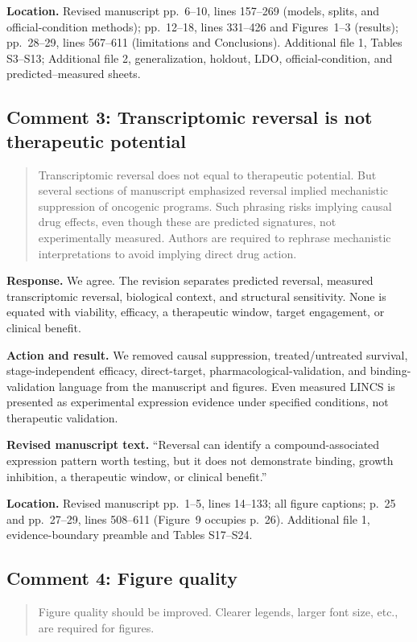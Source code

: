 \documentclass[10pt]{article}
\newenvironment{reviewcomment}{%
  \begin{quote}\small\itshape\color{black}
}{\end{quote}}
\newcommand{\Response}{\textbf{Response.} }
\newcommand{\Action}{\textbf{Action and result.} }
\newcommand{\RevisedText}{\textbf{Revised manuscript text.} }
\newcommand{\Location}{\textbf{Location.} }
\newcommand{\qtext}[1]{``#1''}
\begin{document}
\Location Revised manuscript pp.~6--10, lines 157--269 (models, splits, and official-condition methods); pp.~12--18, lines 331--426 and Figures~1--3 (results); pp.~28--29, lines 567--611 (limitations and Conclusions). Additional file 1, Tables S3--S13; Additional file 2, generalization, holdout, LDO, official-condition, and predicted--measured sheets.

\subsection*{Comment 3: Transcriptomic reversal is not therapeutic potential}
\begin{reviewcomment}
Transcriptomic reversal does not equal to therapeutic potential. But several sections of manuscript emphasized reversal implied mechanistic suppression of oncogenic programs. Such phrasing risks implying causal drug effects, even though these are predicted signatures, not experimentally measured. Authors are required to rephrase mechanistic interpretations to avoid implying direct drug action.
\end{reviewcomment}

\Response We agree. The revision separates predicted reversal, measured transcriptomic reversal, biological context, and structural sensitivity. None is equated with viability, efficacy, a therapeutic window, target engagement, or clinical benefit.

\Action We removed causal suppression, treated/untreated survival, stage-independent efficacy, direct-target, pharmacological-validation, and binding-validation language from the manuscript and figures. Even measured LINCS is presented as experimental expression evidence under specified conditions, not therapeutic validation.

\RevisedText \qtext{Reversal can identify a compound-associated expression pattern worth testing, but it does not demonstrate binding, growth inhibition, a therapeutic window, or clinical benefit.}

\Location Revised manuscript pp.~1--5, lines 14--133; all figure captions; p.~25 and pp.~27--29, lines 508--611 (Figure~9 occupies p.~26). Additional file 1, evidence-boundary preamble and Tables S17--S24.

\subsection*{Comment 4: Figure quality}
\begin{reviewcomment}
Figure quality should be improved. Clearer legends, larger font size, etc., are required for figures.
\end{reviewcomment}
\end{document}
